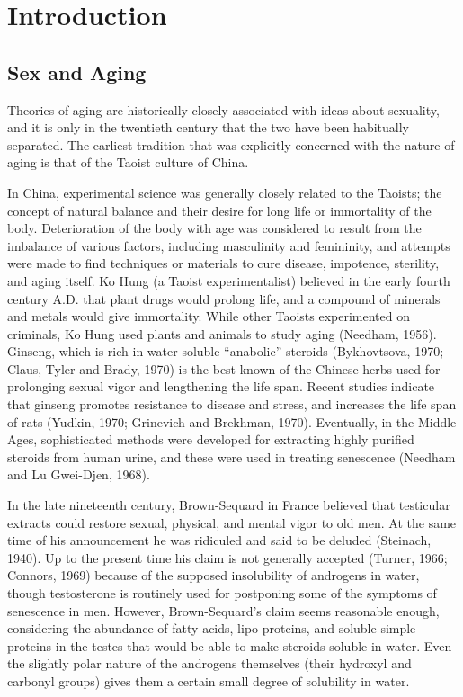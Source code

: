 \chapter{Introduction}

\section{Sex and Aging}

Theories of aging are historically closely associated with ideas about
sexuality, and it is only in the twentieth century that the two have
been habitually separated. The earliest tradition that was explicitly
concerned with the nature of aging is that of the Taoist culture of China.

In China, experimental science was generally closely related to the Taoists; the
concept of natural balance and their desire for long life or immortality of the
body. Deterioration of the body with age was considered to result from the imbalance of
various factors, including masculinity and femininity, and attempts were made to find
techniques or materials to cure disease, impotence, sterility, and aging itself. Ko Hung
(a Taoist experimentalist) believed in the early fourth century A.D. that plant drugs would
prolong life, and a compound of minerals and metals would give immortality. While other
Taoists experimented on criminals, Ko Hung used plants and animals to study aging (Needham, 1956).
Ginseng, which is rich in water-soluble ``anabolic'' steroids (Bykhovtsova, 1970; Claus, Tyler and Brady, 1970) is
the best known of the Chinese herbs used for prolonging sexual vigor and lengthening the life span. Recent
studies indicate that ginseng promotes resistance to disease and stress, and increases the life
span of rats (Yudkin, 1970; Grinevich and Brekhman, 1970). Eventually, in the Middle Ages, sophisticated
methods were developed for extracting highly purified steroids from human urine, and these were
used in treating senescence (Needham and Lu Gwei-Djen, 1968).

In the late nineteenth century, Brown-Sequard in France believed that testicular extracts could restore
sexual, physical, and mental vigor to old men. At the same time of his announcement he was ridiculed
and said to be deluded (Steinach, 1940). Up to the present time his claim is not generally accepted
(Turner, 1966; Connors, 1969) because of the supposed insolubility of androgens in water, though testosterone
is routinely used for postponing some of the symptoms of senescence in men. However, Brown-Sequard's claim seems
reasonable enough, considering the abundance of fatty acids, lipo-proteins, and soluble simple proteins in the 
testes that would be able to make steroids soluble in water. Even the slightly polar nature of the androgens themselves
(their hydroxyl and carbonyl groups) gives them a certain small degree of solubility in water.

